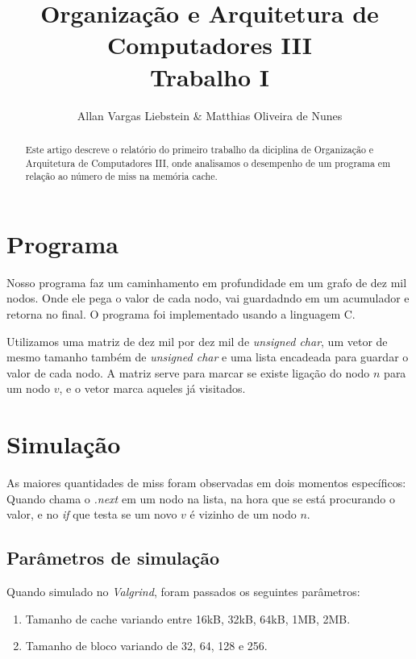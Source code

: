 \documentclass[12pt]{article}
\title{Organização e Arquitetura de Computadores III\\ Trabalho I}
\author{Allan Vargas Liebstein & Matthias Oliveira de Nunes}
\begin{document}
\maketitle

\begin{abstract}

Este artigo descreve o relatório do primeiro trabalho da diciplina de
Organização e Arquitetura de Computadores III, onde analisamos o desempenho de
um programa em relação ao número de miss na memória cache.

\end{abstract}

\section{Programa}

Nosso programa faz um caminhamento em profundidade em um grafo de dez mil nodos.
Onde ele pega o valor de cada nodo, vai guardadndo em um acumulador e retorna no
final. O programa foi implementado usando a linguagem C.

Utilizamos uma matriz de dez mil por dez mil de \emph{unsigned char}, um vetor
de mesmo tamanho também de \emph{unsigned char} e uma lista encadeada para
guardar o valor de cada nodo. A matriz serve para marcar se existe ligação do
nodo $n$ para um nodo $v$, e o vetor marca aqueles já visitados.

\section{Simulação}

As maiores quantidades de miss foram observadas em dois momentos específicos:
Quando chama o \emph{.next} em um nodo na lista, na hora que se está procurando
o valor, e no \emph{if} que testa se um novo $v$ é vizinho de um nodo $n$.

\subsection{Parâmetros de simulação}

Quando simulado no \emph{Valgrind}, foram passados os seguintes parâmetros:

\begin{enumerate}

\item Tamanho de cache variando entre 16kB, 32kB, 64kB, 1MB, 2MB.

\item Tamanho de bloco variando de 32, 64, 128 e 256.

\end{enumerate}
\end{document}
